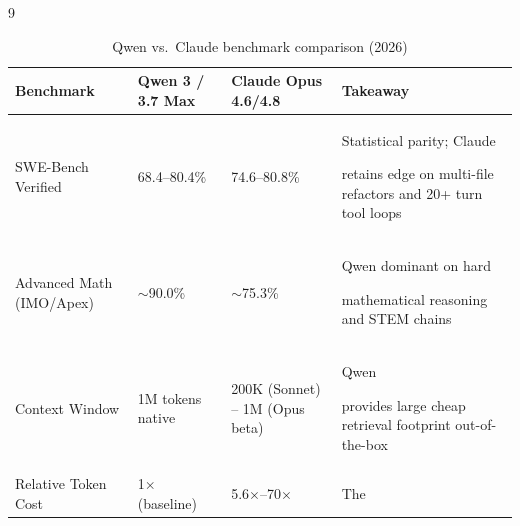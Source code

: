 \documentclass[11pt]{article}
\theoremstyle{definition}
\begin{document}
\begin{thebibliography}{9}
\begin{table}[h]





\centering





\caption{Qwen vs.\ Claude benchmark comparison (2026)}





\begin{tabular}{p{3.8cm}p{2.5cm}p{2.8cm}p{4cm}}





\toprule





\textbf{Benchmark} & \textbf{Qwen 3 / 3.7 Max} & \textbf{Claude Opus 4.6/4.8} & \textbf{Takeaway} \\





\midrule





SWE-Bench Verified & 68.4--80.4\% & 74.6--80.8\% & Statistical parity; Claude





  retains edge on multi-file refactors and 20+ turn tool loops \\





Advanced Math (IMO/Apex) & $\sim$90.0\% & $\sim$75.3\% & Qwen dominant on hard





  mathematical reasoning and STEM chains \\





Context Window & 1M tokens native & 200K (Sonnet) -- 1M (Opus beta) & Qwen





  provides large cheap retrieval footprint out-of-the-box \\





Relative Token Cost & 1$\times$ (baseline) & 5.6$\times$--70$\times$ & The






\end{tabular}
\end{table}
\end{thebibliography}
\end{document}
